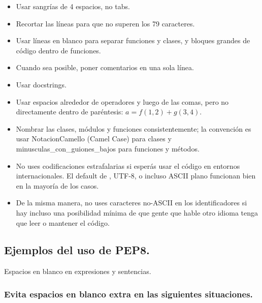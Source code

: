 \begin{itemize}
\item Usar sangrías de 4 espacios, no tabs.
\item Recortar las líneas para que no superen los 79 caracteres.
\item Usar líneas en blanco para separar funciones y clases, y bloques grandes de código dentro de funciones.
\item Cuando sea posible, poner comentarios en una sola línea.
\item Usar docstrings.
\item Usar espacios alrededor de operadores y luego de las comas, pero no directamente dentro de paréntesis: $a = f(1, 2) + g(3, 4)$.
\item Nombrar las clases, módulos y funciones consistentemente; la convención es usar NotacionCamello (Camel Case) para clases y minusculas\_con\_guiones\_bajos para funciones y métodos.
\item No uses codificaciones estrafalarias si esperás usar el código en entornos internacionales. El default de \python, UTF-8, o incluso ASCII plano funcionan bien en la mayoría de los casos.
\item De la misma manera, no uses caracteres no-ASCII en los identificadores si hay incluso una  posibilidad mínima de que gente que hable otro idioma tenga que leer o mantener el código.
\end{itemize}

\subsection{Ejemplos del uso de PEP8.}

Espacios en blanco en expresiones y sentencias.

\subsubsection{Evita espacios en blanco extra en las siguientes situaciones.}

